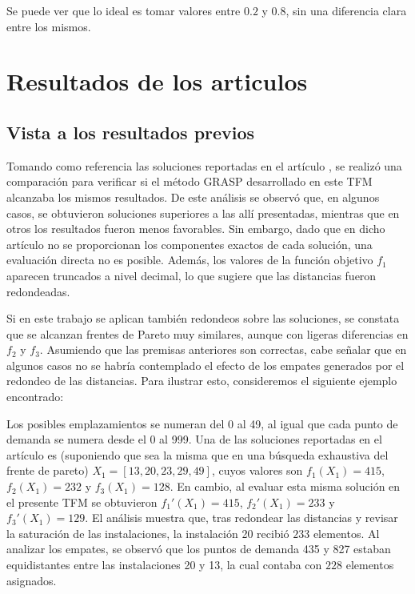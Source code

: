 \documentclass[12pt,a4paper]{book}
\begin{document}
Se puede ver que lo ideal es tomar valores entre $0.2$ y $0.8$, sin una diferencia clara entre los mismos.

\section{Resultados de los articulos}

\subsection{Vista a los resultados previos}
\label{sec:articulo2}
Tomando como referencia las soluciones reportadas en el artículo \cite{k-Balanced_2}, se realizó una comparación para verificar si el método GRASP desarrollado en este TFM alcanzaba los mismos resultados. De este análisis se observó que, en algunos casos, se obtuvieron soluciones superiores a las allí presentadas, mientras que en otros los resultados fueron menos favorables.
Sin embargo, dado que en dicho artículo no se proporcionan los componentes exactos de cada solución, una evaluación directa no es posible. 
Además, los valores de la función objetivo $f_1$ aparecen truncados a nivel decimal, lo que sugiere que las distancias fueron redondeadas.

Si en este trabajo se aplican también redondeos sobre las soluciones, se constata que se alcanzan frentes de Pareto muy similares, aunque con ligeras diferencias en $f_2$ y $f_3$. Asumiendo que las premisas anteriores son correctas, cabe señalar que en algunos casos no se habría contemplado el efecto de los empates generados por el redondeo de las distancias. Para ilustrar esto, consideremos el siguiente ejemplo encontrado:

Los posibles emplazamientos se numeran del 0 al 49, al igual que cada punto de demanda se numera desde el 0 al 999. Una de las soluciones reportadas en el artículo es (suponiendo que sea la misma que en una búsqueda exhaustiva del frente de pareto) $X_1 = [13, 20, 23, 29, 49]$, cuyos valores son $f_1(X_1) = 415$, $f_2(X_1) = 232$ y $f_3(X_1) = 128$. En cambio, al evaluar esta misma solución en el presente TFM se obtuvieron $f_1'(X_1) = 415$, $f_2'(X_1) = 233$ y $f_3'(X_1) = 129$.
El análisis muestra que, tras redondear las distancias y revisar la saturación de las instalaciones, la instalación 20 recibió $233$ elementos. Al analizar los empates, se observó que los puntos de demanda 435 y 827 estaban equidistantes entre las instalaciones 20 y 13, la cual contaba con $228$ elementos asignados.
\end{document}
